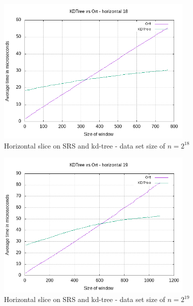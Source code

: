 {\begin{figure}[h]
    \centering
    \includegraphics[width = 0.85\textwidth]{pictures/analysis/hori_18.png}
    \caption{Horizontal slice on SRS and kd-tree - data set size of $n=2^{18}$}\label{fig:hori_18}
\end{figure}


\begin{figure}[h]
    \centering
    \includegraphics[width = 0.85\textwidth]{pictures/analysis/hori_19.png}
    \caption{Horizontal slice on SRS and kd-tree - data set size of $n=2^{19}$}\label{fig:hori_19}
\end{figure}


}
